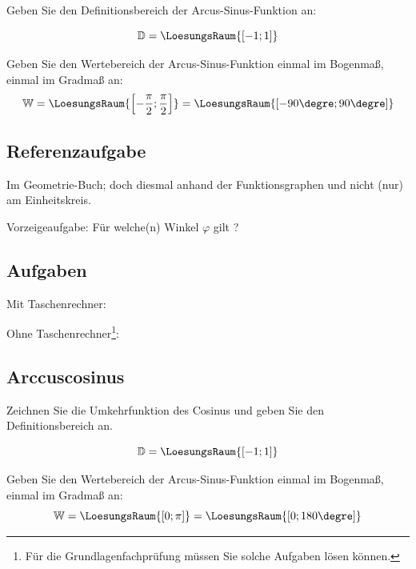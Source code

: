 Geben Sie den Definitionsbereich der Arcus-Sinus-Funktion an:

$$\mathbb{D} = \LoesungsRaum{\left[-1; 1\right]}$$

Geben Sie den Wertebereich der Arcus-Sinus-Funktion einmal im Bogenmaß,
einmal im Gradmaß an:
$$\mathbb{W} = \LoesungsRaum{\left[-\frac{\pi}{2}; \frac{\pi}{2}\right]}  =  \LoesungsRaum{[-90\degre; 90\degre]}$$
\newpage


\subsection*{Referenzaufgabe}

Im Geometrie-Buch; doch diesmal anhand der Funktionsgraphen und nicht (nur) am Einheitskreis.

Vorzeigeaufgabe: Für welche(n) Winkel $\varphi$ gilt \fbox{$\sin(\varphi) = -\sin(-41.7\degre)$}?


\trigsysDsin{}

\subsection*{Aufgaben}

Mit Taschenrechner:


Ohne Taschenrechner\footnote{Für die Grundlagenfachprüfung müssen Sie solche Aufgaben lösen können.}:



\newpage

\subsection{Arccuscosinus}
Zeichnen Sie die Umkehrfunktion des Cosinus und geben Sie den Definitionsbereich an.



$$\mathbb{D} = \LoesungsRaum{[-1; 1]}$$

Geben Sie den Wertebereich der Arcus-Sinus-Funktion einmal im Bogenmaß,
einmal im Gradmaß an:
$$\mathbb{W} = \LoesungsRaum{[0; \pi]}  =  \LoesungsRaum{[0; 180\degre]}$$

